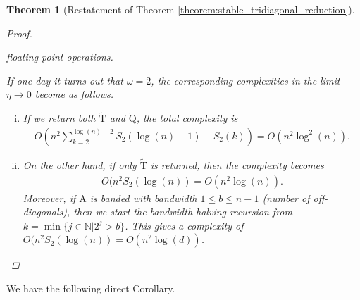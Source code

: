 \documentclass{article}
\newcommand{\lpar}{\left(}
\newcommand{\rpar}{\right)}
\newtheorem{theorem}{Theorem}[section]
\newcommand\matA{\boldsymbol{\mathrm{A}}}
\newcommand\matQtilde{\widetilde{\boldsymbol{\mathrm{Q}}}}
\newcommand\matTtilde{\widetilde{\boldsymbol{\mathrm{T}}}}
\begin{document}
\begin{theorem}[Restatement of Theorem \ref{theorem:stable_tridiagonal_reduction}]
\begin{proof}
\begin{enumerate}[(i)]
            floating point operations.
        \end{enumerate} 
        If one day it turns out that $\omega=2$, the corresponding complexities in the limit $\eta\rightarrow 0$ become as follows.
        \begin{enumerate}[(i)]
            \item If we return both $\matTtilde$ and $\matQtilde$, the total complexity is
            \begin{align*}
                O\lpar
                    n^2 \sum_{k=2}^{\log(n)-2} S_2(\log(n)-1)-S_2(k)
                \rpar
                =
                O(n^2\log^2(n)).
            \end{align*}
            \item On the other hand, if only $\matTtilde$ is returned, then the complexity becomes \begin{align*}
                O(n^2S_2(\log(n))=O(n^2\log(n)).
            \end{align*}
            Moreover, if $\matA$ is banded with bandwidth $1\leq b \leq n-1$ (number of off-diagonals), then we start the bandwidth-halving recursion from $k=\min\{ j\in\mathbb{N} | 2^j>b\}$. This gives a complexity of $O(n^2S_2(\log(n))=O(n^2\log(d))$. 
        \end{enumerate}
    \end{proof}
\end{theorem}
We have the following direct Corollary.
\end{document}
